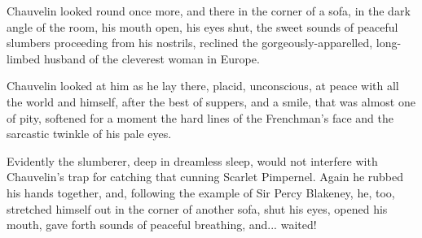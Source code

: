 Chauvelin looked round once more, and there in the corner of a sofa, in the dark angle of the room, his mouth open, his eyes shut, the sweet sounds of peaceful slumbers proceeding from his nostrils, reclined the gorgeously-apparelled, long-limbed husband of the cleverest woman in Europe.

Chauvelin looked at him as he lay there, placid, unconscious, at peace with all the world and himself, after the best of suppers, and a smile, that was almost one of pity, softened for a moment the hard lines of the Frenchman's face and the sarcastic twinkle of his pale eyes.

Evidently the slumberer, deep in dreamless sleep, would not interfere with Chauvelin's trap for catching that cunning Scarlet Pimpernel. Again he rubbed his hands together, and, following the example of Sir Percy Blakeney, he, too, stretched himself out in the corner of another sofa, shut his eyes, opened his mouth, gave forth sounds of peaceful breathing, and... waited!